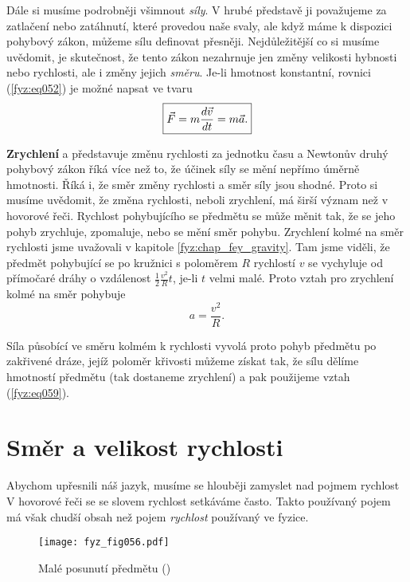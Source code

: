     Dále si musíme podrobněji všimnout \emph{síly}. V hrubé představě ji považujeme za zatlačení 
    nebo zatáhnutí, které provedou naše svaly, ale když máme k dispozici pohybový zákon, můžeme 
    sílu definovat přesněji. Nejdůležitější co si musíme uvědomit, je skutečnost, že tento zákon 
    nezahrnuje jen změny velikosti hybnosti nebo rychlosti, ale i změny jejich \emph{směru}. Je-li 
    hmotnost konstantní, rovnici (\ref{fyz:eq052}) je možné napsat ve tvaru
    \begin{equation}\label{fyz:eq053}
      \boxed{
        \vec{F} = m\dfrac{d \vec{v}}{d t} = m\vec{a}.
       }
    \end{equation}
    
    \textbf{Zrychlení} a představuje změnu rychlosti za jednotku času a Newtonův druhý pohybový 
    zákon říká více než to, že účinek síly se mění nepřímo úměrně hmotnosti. Říká i, že směr změny 
    rychlosti a směr síly jsou shodné. Proto si musíme uvědomit, že změna rychlosti, neboli 
    zrychlení, má širší význam než v hovorové řeči. Rychlost pohybujícího se předmětu se může měnit 
    tak, že se jeho pohyb zrychluje, zpomaluje, nebo se mění směr pohybu. Zrychlení kolmé na směr 
    rychlosti jsme uvažovali v kapitole \ref{fyz:chap_fey_gravity}. Tam jsme viděli, že předmět 
    pohybující se po kružnici s poloměrem \(R\) rychlostí \(v\) se vychyluje od přímočaré dráhy o 
    vzdálenost \(\frac{1}{2}\frac{v^2}{R}t\), je-li \(t\) velmi malé. Proto vztah pro zrychlení 
    kolmé na směr pohybuje
    \begin{equation}\label{fyz:eq059}
      a = \frac{v^2}{R}.
    \end{equation}
    
    Síla působící ve směru kolmém k rychlosti vyvolá proto pohyb předmětu po zakřivené dráze, jejíž 
    poloměr křivosti můžeme získat tak, že sílu dělíme hmotností předmětu (tak dostaneme zrychlení) 
    a pak použijeme vztah (\ref{fyz:eq059}).
    
  \section{Směr a velikost rychlosti}\label{fyz:IchapIXsecII}
    Abychom upřesnili náš jazyk, musíme se hlouběji zamyslet nad pojmem rychlost V hovorové řeči se 
    se slovem rychlost setkáváme často. Takto používaný pojem má však chudší obsah než pojem 
    \emph{rychlost} používaný ve fyzice.

    \begin{figure}[ht!]  %
      \centering
      \texttt{[image: fyz\_fig056.pdf]}
      \caption{Malé posunutí předmětu (\cite[s.~124]{Feynman01})}
      \label{fyz:fig056}
    \end{figure}
    
